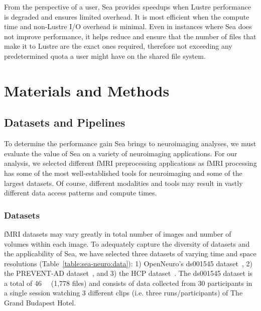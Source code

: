 \documentclass[fleqn,10pt]{wlscirep}
\begin{document}
    From the perspective of a user, Sea provides speedups when
    Lustre performance is degraded and ensures limited overhead. It is most efficient
    when the compute time and non-Lustre I/O overhead is minimal. Even in
    instances where Sea does not improve performance, it helps reduce and ensure
    that the number of files that make it to Lustre are the exact ones required,
    therefore not exceeding any predetermined quota a user might have on the
    shared file system. 
    
    
    
    
    
    
    
    
    
    \section{Materials and Methods}
    
    
    \subsection{Datasets and Pipelines}
    
    To determine the performance gain Sea brings to neuroimaging analyses, we
    must evaluate the value of Sea on a variety of neuroimaging applications.
    For our analysis, we selected different fMRI preprocessing applications as
    fMRI processing has some of the most well-established tools for neuroimaging
    and some of the largest datasets. Of course, different modalities and tools
    may result in vastly different data access patterns and compute times.
    
    \subsubsection{Datasets}
    fMRI datasets may vary greatly in total number of images and number of
    volumes within each image. To adequately capture the diversity of datasets
    and the applicability of Sea, we have selected three datasets of varying
    time and space resolutions (Table~\ref{table:sea-neuro:data}): 1)
    OpenNeuro's ds001545 dataset~\cite{ds001545}, 2) the PREVENT-AD
    dataset~\cite{preventad}, and 3) the HCP dataset~\cite{HCP}. The ds001545
    dataset is a total of \SI{46}{\giga\byte} (1,778 files) and consists of data
    collected from 30 participants in a single session watching 3 different
    clips (i.e. three runs/participants) of The Grand Budapest Hotel.
    
\end{document}
